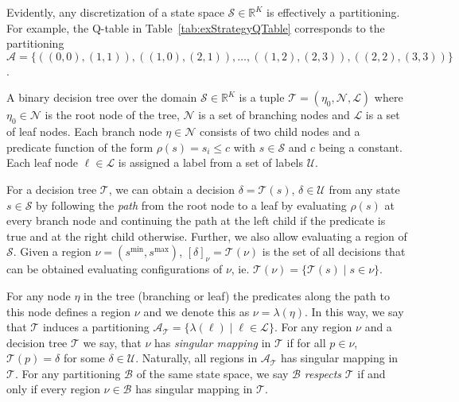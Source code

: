 Evidently, any discretization of a state space $\mathcal{S} \in \mathbb{R}^K$ is
effectively a partitioning. For example, the Q-table in
Table~\ref{tab:exStrategyQTable} corresponds to the partitioning $\mathcal{A} =
\{ ((0,0),(1,1)), ((1,0),(2,1)),\ldots, ((1,2),(2,3)), ((2,2),(3,3)) \}$.

\begin{definition}%
\label{def:decisionTree}
    A binary decision tree over the domain $\mathcal{S} \in \mathbb{R}^K$ is a
    tuple $\mathcal{T} = (\eta_{0}, \mathcal{N}, \mathcal{L})$ where $\eta_{0}
    \in \mathcal{N}$ is the root node of the tree, $\mathcal{N}$ is a set of
    branching nodes and $\mathcal{L}$ is a set of leaf nodes. Each branch node
    $\eta \in \mathcal{N}$ consists of two child nodes and a predicate function 
    of the form $\rho(s) = s_{i} \leq c$ with $s \in \mathcal{S}$ and $c$ being a
    constant. Each leaf node $\ell \in \mathcal{L}$ is assigned a label from a
    set of labels $\mathcal{U}$.
\end{definition}

For a decision tree $\mathcal{T}$, we can obtain a decision $\delta =
\mathcal{T}(s)$, $\delta \in \mathcal{U}$ from any state $s \in \mathcal{S}$ by
following the \textit{path} from the root node to a leaf by evaluating $\rho(s)$
at every branch node and continuing the path at the left child if the predicate
is true and at the right child otherwise. Further, we also allow evaluating a
region of $\mathcal{S}$.  Given a region $\nu = (s^{\min}, s^{\max})$,
$[\delta]_{\nu} = \mathcal{T}(\nu)$ is the set of all decisions that can be
obtained evaluating configurations of $\nu$, ie. $\mathcal{T}(\nu) = \{
\mathcal{T}(s) \mid s \in \nu \}$.

For any node $\eta$ in the tree (branching or leaf) the predicates along the
path to this node defines a region $\nu$ and we denote this as $\nu =
\lambda(\eta)$. In this way, we say that $\mathcal{T}$ induces a partitioning
$\mathcal{A}_{\mathcal{T}} = \{ \lambda(\ell) \mid \ell \in \mathcal{L} \}$. For
any region $\nu$ and a decision tree $\mathcal{T}$ we say, that $\nu$ has
\textit{singular mapping} in $\mathcal{T}$ if for all $p \in \nu$,
$\mathcal{T}(p) = \delta$ for some $\delta \in \mathcal{U}$. Naturally, all
regions in $\mathcal{A}_{\mathcal{T}}$ has singular mapping in $\mathcal{T}$.
For any partitioning $\mathcal{B}$ of the same state space, we say $\mathcal{B}$
\textit{respects} $\mathcal{T}$ if and only if every region $\nu \in
\mathcal{B}$ has singular mapping in $\mathcal{T}$.
